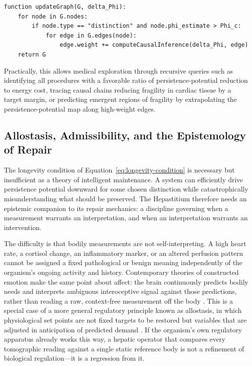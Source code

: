 \documentclass[12pt]{article}
\begin{document}
\begin{lstlisting}[language=JavaScriptRSVP, caption={Recursive update cycle of the semantic microscope.}, label={lst:update-graph}]
function updateGraph(G, delta_Phi):
    for node in G.nodes:
        if node.type == "distinction" and node.phi_estimate > Phi_c:
            for edge in G.edges(node):
                edge.weight += computeCausalInference(delta_Phi, edge)
    return G
\end{lstlisting}

Practically, this allows medical exploration through recursive queries such as identifying all procedures with a favorable ratio of persistence-potential reduction to energy cost, tracing causal chains reducing fragility in cardiac tissue by a target margin, or predicting emergent regions of fragility by extrapolating the persistence-potential map along high-weight edges.

\subsection{Allostasis, Admissibility, and the Epistemology of Repair}
\label{sec:allostasis}

The longevity condition of Equation~\eqref{eq:longevity-condition} is necessary but insufficient as a theory of intelligent maintenance. A system can efficiently drive persistence potential downward for some chosen distinction while catastrophically misunderstanding what should be preserved. The Hepastitium therefore needs an epistemic companion to its repair mechanics: a discipline governing when a measurement warrants an interpretation, and when an interpretation warrants an intervention.

The difficulty is that bodily measurements are not self-interpreting. A high heart rate, a cortisol change, an inflammatory marker, or an altered perfusion pattern cannot be assigned a fixed pathological or benign meaning independently of the organism's ongoing activity and history. Contemporary theories of constructed emotion make the same point about affect: the brain continuously predicts bodily needs and interprets ambiguous interoceptive signal against those predictions, rather than reading a raw, context-free measurement off the body \cite{barrettmiller2026longevity}. This is a special case of a more general regulatory principle known as allostasis, in which physiological set points are not fixed targets to be restored but variables that are adjusted in anticipation of predicted demand \cite{sterling2012}. If the organism's own regulatory apparatus already works this way, a hepatic operator that compares every tomographic reading against a single static reference body is not a refinement of biological regulation---it is a regression from it.
\end{document}
